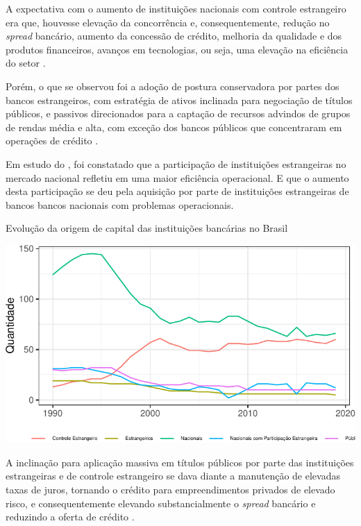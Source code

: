 \documentclass[
  12pt,
  12pt,
  openright,
  oneside,
  a4paper,
  chapter=TITLE,
  section=TITLE,
  subsection=TITLE,
  subsubsection=TITLE,
  english,
  portugues,
  sumario=tradicional]{abntex2}
\begin{document}
A expectativa com o aumento de instituições nacionais com controle estrangeiro era que, houvesse elevação da concorrência e, consequentemente, redução no \emph{spread} bancário, aumento da concessão de crédito, melhoria da qualidade e dos produtos financeiros, avanços em tecnologias, ou seja, uma elevação na eficiência do setor \cite{camargo:2009}.

Porém, o que se observou foi a adoção de postura conservadora por partes dos bancos estrangeiros, com estratégia de ativos inclinada para negociação de títulos públicos, e passivos direcionados para a captação de recursos advindos de grupos de rendas média e alta, com exceção dos bancos públicos que concentraram em operações de crédito \cite{camargo:2009}.

Em estudo do \textcite{BCB:1999}, foi constatado que a participação de instituições estrangeiras no mercado nacional refletiu em uma maior eficiência operacional. E que o aumento desta participação se deu pela aquisição por parte de instituições estrangeiras de bancos bancos nacionais com problemas operacionais.

\begin{grafico}[!htbp]
\vspace{20pt}
\caption{Evolução da origem de capital das instituições bancárias no Brasil}
\vspace{-4mm}

\begin{center}\includegraphics{12-exportedfigures/capital.graphic-1} \end{center}
\label{graf:ev.capital}
\end{grafico}

A inclinação para aplicação massiva em títulos públicos por parte das instituições estrangeiras e de controle estrangeiro se dava diante a manutenção de elevadas taxas de juros, tornando o crédito para empreendimentos privados de elevado risco, e consequentemente elevando substancialmente o \emph{spread} bancário e reduzindo a oferta de crédito \cite{camargo:2009}.
\end{document}
